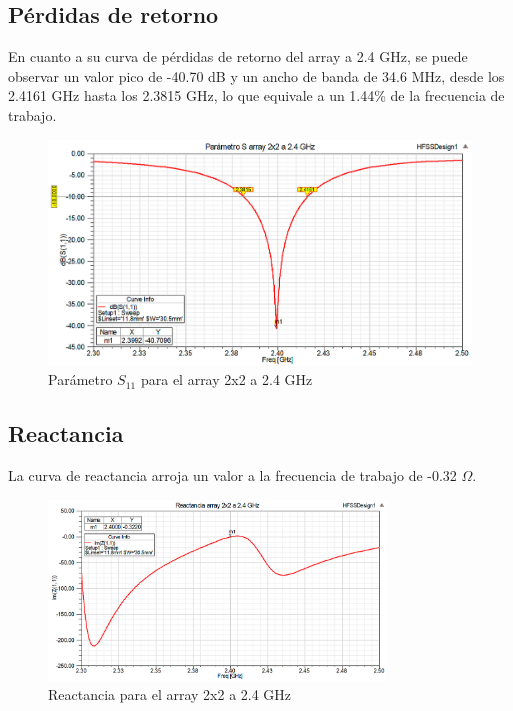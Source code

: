 \subsection{Pérdidas de retorno}
\par En cuanto a su curva de pérdidas de retorno del array a 2.4 GHz, se puede observar un valor pico de -40.70 dB y un ancho de banda de 34.6 MHz, desde los 2.4161 GHz hasta los 2.3815 GHz, lo que equivale a un 1.44\% de la frecuencia de trabajo.
\\
\begin{figure}[H]
    \centering
        \includegraphics[width=\textwidth]{archivos/analisis/2x21/1}
        \caption{Parámetro $S_{11}$ para el array 2x2 a 2.4 GHz}
        \label{fig:s2x21}
\end{figure}

\newpage
\subsection{Reactancia}
\par La curva de reactancia arroja un valor a la frecuencia de trabajo de -0.32 $\Omega$. 
\\
\begin{figure}[H]
    \centering
        \includegraphics[width=0.8\textwidth]{archivos/analisis/2x21/2}
        \caption{Reactancia para el array 2x2 a 2.4 GHz}
        \label{fig:react2x21}
\end{figure}

